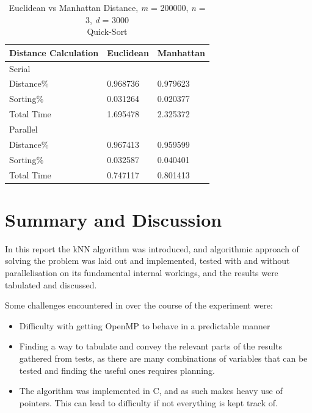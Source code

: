 \documentclass[a4paper,twoside,11pt]{report}
\begin{document}
\begin{table}[]
	\centering
	\begin{tabular}{lll}
		\hline
		Distance Calculation & Euclidean & Manhattan \\ \hline \hline
		Serial                &           &           \\ \hline
		Distance\%            & 0.968736  & 0.979623  \\
		Sorting\%             & 0.031264  & 0.020377  \\
		Total Time            & 1.695478  & 2.325372  \\ \hline
		Parallel              &           &           \\ \hline
		Distance\%            & 0.967413  & 0.959599  \\
		Sorting\%             & 0.032587  & 0.040401  \\
		Total Time            & 0.747117  & 0.801413  \\  \hline
	\end{tabular}
	\caption{Euclidean vs Manhattan Distance, \textit{m} = 200000, \textit{n} = 3, \textit{d} = 3000\\
	Quick-Sort}
	\label{evm}
\end{table}

\section*{Summary and Discussion}

In this report the kNN algorithm was introduced, and algorithmic approach of solving the problem was laid out and implemented, tested with and without parallelisation on its fundamental internal workings, and the results were tabulated and discussed.

Some challenges encountered in over the course of the experiment were:
\begin{itemize}
	\item Difficulty with getting OpenMP to behave in a predictable manner
	\item Finding a way to tabulate and convey the relevant parts of the results gathered from tests, as there are many combinations of variables that can be tested and finding the useful ones requires planning.
	\item The algorithm was implemented in C, and as such makes heavy use of pointers. This can lead to difficulty if not everything is kept track of.
\end{itemize}


\newpage
\end{document}
